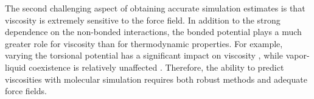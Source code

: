 \documentclass[preprint,review,12pt]{elsarticle}
\begin{document}
	The second challenging aspect of obtaining accurate simulation estimates is that viscosity is extremely sensitive to the force field. In addition to the strong dependence on the non-bonded interactions, the bonded potential plays a much greater role for viscosity than for thermodynamic properties. For example, varying the torsional potential has a significant impact on viscosity \cite{Nieto2006}, while vapor-liquid coexistence is relatively unaffected \cite{Bernard2009}. Therefore, the ability to predict viscosities with molecular simulation requires both robust methods and adequate force fields. 
	
	
	
	

	 
	 
\end{document}
